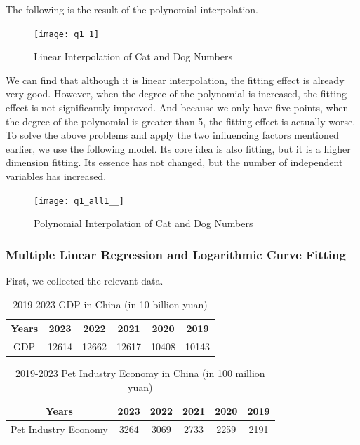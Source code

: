 \documentclass[withoutpreface,bwprint]{cumcmthesis} %
\begin{document}
\par The following is the result of the polynomial interpolation.
\clearpage
\begin{figure}[htbp]
	\centering
	\texttt{[image: q1\_1]}
	\caption{Linear Interpolation of Cat and Dog Numbers}
\end{figure}
\par We can find that although it is linear interpolation, the fitting effect is already very good.
However, when the degree of the polynomial is increased, the fitting effect is not significantly improved.
And because we only have five points, when the degree of the polynomial is greater than 5, the fitting effect is actually worse.
To solve the above problems and apply the two influencing factors mentioned earlier, we use the following model.
Its core idea is also fitting, but it is a higher dimension fitting.
Its essence has not changed, but the number of independent variables has increased.
\begin{figure}[htbp]
	\centering
	\texttt{[image: q1\_all1\_\_]}
	\caption{Polynomial Interpolation of Cat and Dog Numbers}
\end{figure}
\subsubsection{Multiple Linear Regression and Logarithmic Curve Fitting}
\par First, we collected the relevant data.
\begin{table}[!htbp]
    \caption{2019-2023 GDP in China (in 10 billion yuan)\cite{2}} \centering
    \begin{tabular}{cccccc}
    \toprule[1.5pt]
    Years & 2023 & 2022 & 2021 & 2020 & 2019 \\
    \midrule[1pt]
    GDP & 12614 & 12662 & 12617 & 10408 & 10143 \\
    \bottomrule[1.5pt]
    \end{tabular}
\end{table}
\begin{table}[!htbp]
    \caption{2019-2023 Pet Industry Economy in China (in 100 million yuan)\cite{3}} \centering
    \begin{tabular}{cccccc}
    \toprule[1.5pt]
    Years & 2023 & 2022 & 2021 & 2020 & 2019 \\
    \midrule[1pt]
    Pet Industry Economy & 3264 & 3069 & 2733 & 2259 & 2191 \\
    \bottomrule[1.5pt]
    \end{tabular}
\end{table}
\end{document}
